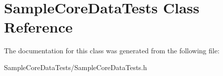 \hypertarget{interface_sample_core_data_tests}{\section{Sample\-Core\-Data\-Tests Class Reference}
\label{interface_sample_core_data_tests}
}


The documentation for this class was generated from the following file\-:\begin{DoxyCompactItemize}
\item 
Sample\-Core\-Data\-Tests/Sample\-Core\-Data\-Tests.\-h\end{DoxyCompactItemize}
